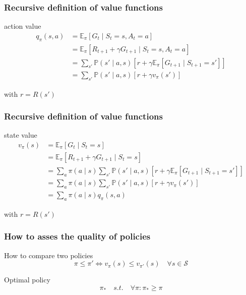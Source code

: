 \documentclass[dvipsnames,svgnames]{beamer}
\begin{document}
\begin{frame}
\frametitle{Recursive definition of value functions}
\begin{block}{action value}
\begin{equation*}
\begin{split}
q_{\pi}(s,a) &= \mathbb{E}_{\pi}[G_t\mid S_t =s, A_t=a]
\\&=\mathbb{E}_{\pi}[R_{t+1}+\gamma G_{t+1}\mid S_t =s, A_t=a]
\\& =\sum_{s'}\mathbb{P}(s'\mid a,s)\left[r + \gamma \mathbb{E}_{\pi}\left[G_{t+1} \mid S_{t+1}=s' \right]\right]
\\& = \sum_{s'}\mathbb{P}(s'\mid a,s)\left[r + \gamma v_{\pi}(s') \right]
\end{split}
\end{equation*}
\end{block}

with $r=R(s')$
\end{frame}


\begin{frame}
\frametitle{Recursive definition of value functions}
\begin{block}{state value}
\begin{equation*}
\begin{split}
v_{\pi}(s) &= \mathbb{E}_{\pi}[G_t\mid S_t =s]
\\&=\mathbb{E}_{\pi}[R_{t+1}+\gamma G_{t+1}\mid S_t =s]
\\& =\sum_{a }\pi(a \mid s) \sum_{s'}\mathbb{P}(s'\mid a,s)\left[r + \gamma \mathbb{E}_{\pi}\left[G_{t+1} \mid S_{t+1}=s' \right]\right]
\\& =\sum_{a }\pi(a \mid s) \sum_{s'}\mathbb{P}(s'\mid a,s)\left[r + \gamma v_{\pi}(s') \right]
\\&=\sum_{a }\pi(a \mid s)q_{\pi}(s,a)
\end{split}
\end{equation*}
\end{block}

with $r=R(s')$
\end{frame}




\begin{frame}
\frametitle{How to asses the quality of policies}
\begin{block}{How to compare two policies}
$$ \pi \leq \pi ' \iff  v_{\pi}(s) \leq v_{\pi'}(s) \quad \forall s \in \mathcal{S}
$$
\end{block}

\pause 

\begin{block}{Optimal policy}
$$ \pi_{*} \quad s.t. \quad \forall \pi : \pi_{*}\geq \pi $$
\end{block}
\end{frame}
\end{document}
